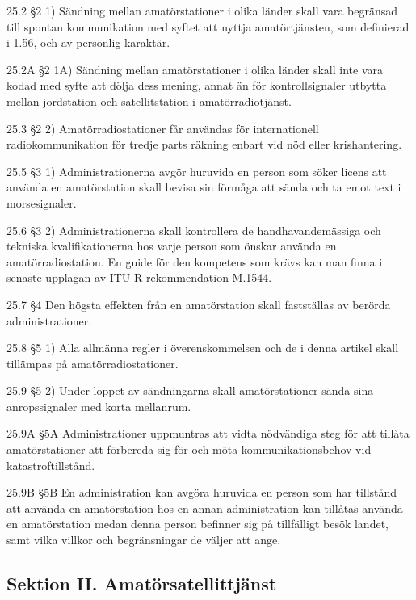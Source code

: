 \begin{multicols}{2}
25.2 \S2 1) Sändning mellan amatörstationer i olika länder skall vara
begränsad till spontan kommunikation med syftet att nyttja amatörtjänsten,
som definierad i 1.56, och av personlig karaktär.
\cite[25.2]{ITU-RR}

25.2A \S2 1A) Sändning mellan amatörstationer i olika länder skall
inte vara kodad med syfte att dölja dess mening, annat än för kontrollsignaler
utbytta mellan jordstation och satellitstation i amatörradiotjänst.
\cite[25.2A]{ITU-RR}

25.3 \S2 2) Amatörradiostationer får användas för internationell
radiokommunikation för tredje parts räkning enbart vid nöd eller
krishantering.
\cite[25.3]{ITU-RR}

25.5 \S3 1) Administrationerna avgör huruvida en person som söker licens
att använda en amatörstation skall bevisa sin förmåga att sända och ta
emot text i morsesignaler.
\cite[25.5]{ITU-RR}

25.6 \S3 2) Administrationerna skall kontrollera de handhavandemässiga och
tekniska kvalifikationerna hos varje person som önskar använda en
amatörradiostation. En guide för den kompetens som krävs kan man finna i
senaste upplagan av ITU-R rekommendation M.1544.
\cite[25.6]{ITU-RR}

25.7 \S4 Den högsta effekten från en amatörstation skall fastställas
av berörda administrationer.
\cite[25.7]{ITU-RR}

25.8 \S5 1) Alla allmänna regler i överenskommelsen och de i denna
artikel skall tillämpas på amatörradiostationer.
\cite[25.8]{ITU-RR}

25.9 \S5 2) Under loppet av sändningarna skall amatörstationer sända
sina anropssignaler med korta mellanrum.
\cite[25.9]{ITU-RR}

25.9A \S5A Administrationer uppmuntras att vidta nödvändiga steg för att
tillåta amatörstationer att förbereda sig för och möta kommunikationsbehov
vid katastroftillstånd.
\cite[25.9A]{ITU-RR}

25.9B \S5B En administration kan avgöra huruvida en person som har tillstånd
att använda en amatörstation hos en annan administration kan tillåtas använda
en amatörstation medan denna person befinner sig på tillfälligt besök landet,
samt vilka villkor och begränsningar de väljer att ange.
\cite[25.9B]{ITU-RR}

\subsection{Sektion II. Amatörsatellittjänst}


\end{multicols}
